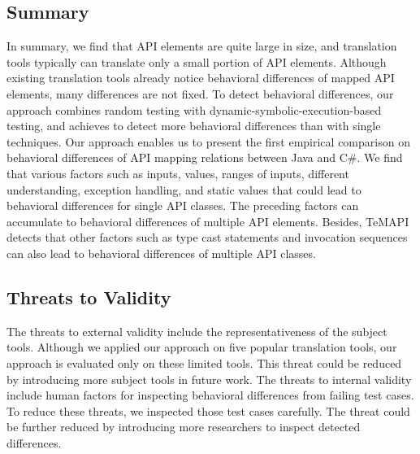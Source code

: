 \subsection{Summary}
\label{sec:evaluation:summary}
In summary, we find that API elements are quite large in size, and translation tools typically can translate only a small portion of API elements. Although existing translation tools already notice behavioral differences of mapped API elements, many differences are not fixed. To detect behavioral differences, our approach combines random testing with dynamic-symbolic-execution-based testing, and achieves to detect more behavioral differences than with single techniques. Our approach enables us to present the first empirical comparison on behavioral differences of API mapping relations between Java and C\#. We find that various factors such as  inputs,  values, ranges of inputs, different understanding, exception handling, and static values that could lead to behavioral differences for single API classes. The preceding factors can accumulate to behavioral differences of multiple API elements. Besides, TeMAPI detects that other factors such as type cast statements and invocation sequences can also lead to behavioral differences of multiple API classes.
\subsection{Threats to Validity}
\label{sec:evaluation:threat}
The threats to external validity include the representativeness of the subject tools. Although we applied
our approach on five popular translation tools, our approach is evaluated only on these limited tools. This threat could be reduced by introducing more subject tools in future work. The threats to internal validity include human factors for inspecting behavioral differences from failing test cases. To reduce these threats, we inspected those test cases carefully. The threat could be further
reduced by introducing more researchers to inspect detected differences.
